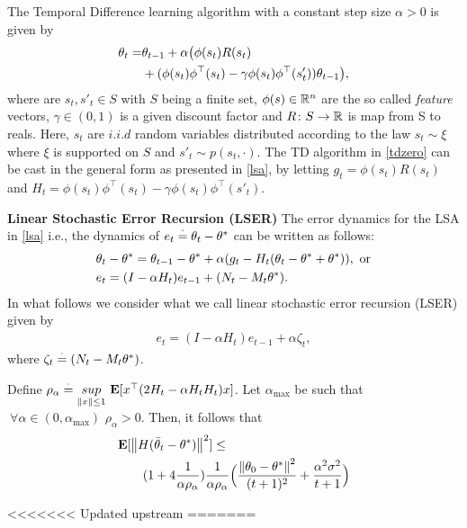 \begin{example}
The Temporal Difference learning algorithm with a constant step size $\alpha>0$ is given by
\begin{align}\label{tdzero}
\theta_t=&\theta_{t-1}+\alpha \big(\phi(s_t) R(s_t)\nn\\&+ (\phi(s_t)\phi^\top(s_t)-\gamma \phi(s_t)\phi^\top(s'_t))\theta_{t-1}\big),
\end{align}
where are $s_t,s'_t\in S$ with $S$ being a finite set, $\phi(s)\in \R^n$ are the so called \emph{feature} vectors, $\gamma\in (0,1)$ is a given discount factor and $R\colon S\ra \R$ is map from S to reals. Here, $s_t$ are $i.i.d$ random variables distributed according to the law $s_t\sim \xi$ where $\xi$ is supported on $S$ and $s'_t\sim p(s_t,\cdot)$. The TD algorithm in \eqref{tdzero} can be cast in the general form as presented in \eqref{lsa}, by letting $g_t=\phi(s_t)R(s_t)$ and $H_t=\phi(s_t)\phi^\top(s_t)-\gamma \phi(s_t)\phi^\top(s'_t)$.
\end{example}

\textbf{Linear Stochastic Error Recursion (LSER)} The error dynamics for the LSA in \eqref{lsa} i.e., the dynamics of $e_t\eqdef\theta_t-\ts$ can be written as follows:
\begin{align}\label{errprelim}
&\theta_t-\ts=\theta_{t-1}-\ts+\alpha(g_t -H_t(\theta_t-\ts+\ts)),\text{~or}\nn\\
&e_t=(I-\alpha H_t)e_{t-1}+(N_t-M_t\ts).
\end{align}
In what follows we consider what we call linear stochastic error recursion (LSER) given by
\begin{align}\label{lsergen}
e_t=(I-\alpha H_t)e_{t-1}+\alpha \zeta_t,
\end{align}
where $\zeta_t\eqdef (N_t-M_t\ts)$.
\begin{theorem}\label{maintheorem}
Define $\rho_\alpha\eqdef \us{sup}{\norm{x}\leq 1}\E[x^\top (2H_t-\alpha H_tH_t)x]$. Let $\alpha_{\max}$ be such that $~\forall \alpha\in(0,\alpha_{\max})$ $\rho_{\alpha}>0$. Then, it follows that
\begin{align}
\begin{split}
\MoveEqLeft\E[\norm{H(\tb_t-\ts)}^2]\leq \\
&(1+4\frac1{\alpha\rho_{\alpha}}) \frac{1}{\alpha\rho_{\alpha}} \Big(\frac{\norm{\theta_0-\ts}^2}{(t+1)^2}+\frac{\alpha^2\sigma^2}{t+1} \Big)
\end{split}
\end{align}
\end{theorem}
<<<<<<< Updated upstream
=======

